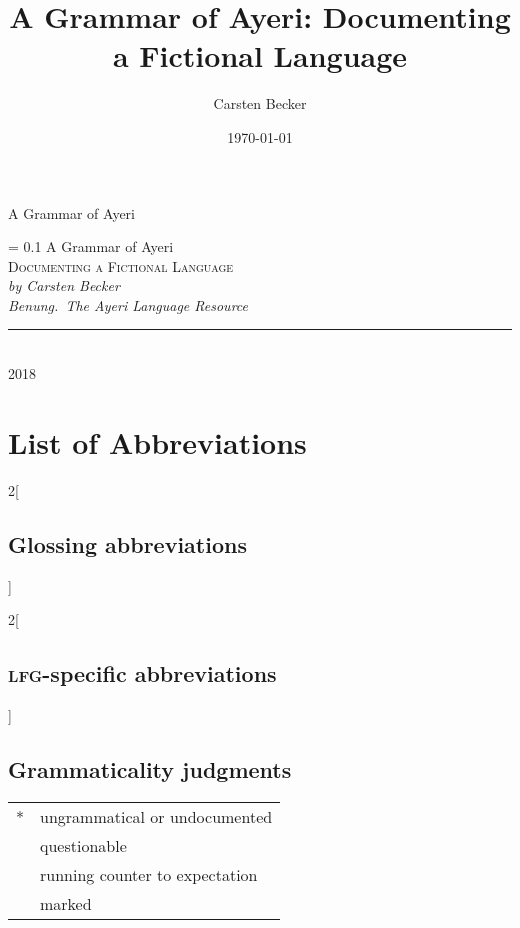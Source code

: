 \documentclass[
	a4paper,
	11pt,
	openany,
	twoside,
	oldfontcommands, %
]{memoir}
\author{Carsten Becker}
\title{A Grammar of Ayeri: Documenting a Fictional Language}
\date{\today}
\newlength\drop
\newcommand*{\titleS}{\begingroup%
\drop = 0.1\textheight
\centering
\vspace*{\drop}
{\Huge A Grammar of Ayeri}\\[\baselineskip]
{\Large\scshape Documenting a Fictional Language}\\[\baselineskip]
{\large\itshape by Carsten Becker}\\[\baselineskip]
\vfill
{\large\itshape Benung.~The Ayeri Language Resource}\\
\rule{0.33\textwidth}{0.4pt}\smallskip\\
{2018}\par
\vspace*{\drop}
\endgroup}
\newcommand{\excl}{\fakesuperscript{!}} %
\newcommand{\hash}{\fakesuperscript{\#}} %
\newcommand{\ques}{\fakesuperscript{?}} %
\newcommand{\Lfg}{\textsc{lfg}}
\begin{document}

\begin{titlingpage}
\begin{center}
{\Huge A Grammar of Ayeri}
\end{center}
\end{titlingpage}


\begin{titlingpage}
\titleS
\clearpage

\end{titlingpage}


\frontmatter
\begin{KeepFromToc}
  \tableofcontents
\end{KeepFromToc}
\clearpage
\listoffigures
\clearpage
\listoftables
\chapter{List of Abbreviations}
\begingroup\multicolsep=0pt
\begin{multicols}{2}[\section*{Glossing abbreviations}]
\printglossary[style=mysuper,type=leipzig]
\end{multicols}

\begin{multicols}{2}[\section*{\Lfg{}-specific abbreviations}]
\printglossary[style=mysuper,type=lfg]
\end{multicols}
\endgroup
\bigskip

\section*{Grammaticality judgments}
\noindent \begin{tabular}[t]{@{} l l}
*		& ungrammatical or undocumented \\
\ques	& questionable \\
\excl	& running counter to expectation \\
\hash	& marked \\
\end{tabular}
\end{document}
